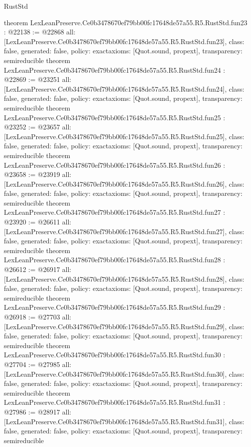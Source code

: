 \begin{lexlean}{RustStd}
\begin{coremodule}
{}
theorem LexLeanPreserve.Ce0b3478670ef79bb00fc17648de57a55.R5.RustStd.fun23 : @22138 := @22868 {
  all: [LexLeanPreserve.Ce0b3478670ef79bb00fc17648de57a55.R5.RustStd.fun23],
  class: false,
  generated: false,
  policy: exact{axioms: [Quot.sound, propext]},
  transparency: semireducible
}
theorem LexLeanPreserve.Ce0b3478670ef79bb00fc17648de57a55.R5.RustStd.fun24 : @22869 := @23251 {
  all: [LexLeanPreserve.Ce0b3478670ef79bb00fc17648de57a55.R5.RustStd.fun24],
  class: false,
  generated: false,
  policy: exact{axioms: [Quot.sound, propext]},
  transparency: semireducible
}
theorem LexLeanPreserve.Ce0b3478670ef79bb00fc17648de57a55.R5.RustStd.fun25 : @23252 := @23657 {
  all: [LexLeanPreserve.Ce0b3478670ef79bb00fc17648de57a55.R5.RustStd.fun25],
  class: false,
  generated: false,
  policy: exact{axioms: [Quot.sound, propext]},
  transparency: semireducible
}
theorem LexLeanPreserve.Ce0b3478670ef79bb00fc17648de57a55.R5.RustStd.fun26 : @23658 := @23919 {
  all: [LexLeanPreserve.Ce0b3478670ef79bb00fc17648de57a55.R5.RustStd.fun26],
  class: false,
  generated: false,
  policy: exact{axioms: [Quot.sound, propext]},
  transparency: semireducible
}
theorem LexLeanPreserve.Ce0b3478670ef79bb00fc17648de57a55.R5.RustStd.fun27 : @23920 := @26611 {
  all: [LexLeanPreserve.Ce0b3478670ef79bb00fc17648de57a55.R5.RustStd.fun27],
  class: false,
  generated: false,
  policy: exact{axioms: [Quot.sound, propext]},
  transparency: semireducible
}
theorem LexLeanPreserve.Ce0b3478670ef79bb00fc17648de57a55.R5.RustStd.fun28 : @26612 := @26917 {
  all: [LexLeanPreserve.Ce0b3478670ef79bb00fc17648de57a55.R5.RustStd.fun28],
  class: false,
  generated: false,
  policy: exact{axioms: [Quot.sound, propext]},
  transparency: semireducible
}
theorem LexLeanPreserve.Ce0b3478670ef79bb00fc17648de57a55.R5.RustStd.fun29 : @26918 := @27703 {
  all: [LexLeanPreserve.Ce0b3478670ef79bb00fc17648de57a55.R5.RustStd.fun29],
  class: false,
  generated: false,
  policy: exact{axioms: [Quot.sound, propext]},
  transparency: semireducible
}
theorem LexLeanPreserve.Ce0b3478670ef79bb00fc17648de57a55.R5.RustStd.fun30 : @27704 := @27985 {
  all: [LexLeanPreserve.Ce0b3478670ef79bb00fc17648de57a55.R5.RustStd.fun30],
  class: false,
  generated: false,
  policy: exact{axioms: [Quot.sound, propext]},
  transparency: semireducible
}
theorem LexLeanPreserve.Ce0b3478670ef79bb00fc17648de57a55.R5.RustStd.fun31 : @27986 := @28917 {
  all: [LexLeanPreserve.Ce0b3478670ef79bb00fc17648de57a55.R5.RustStd.fun31],
  class: false,
  generated: false,
  policy: exact{axioms: [Quot.sound, propext]},
  transparency: semireducible
}
\end{coremodule}
\end{lexlean}
